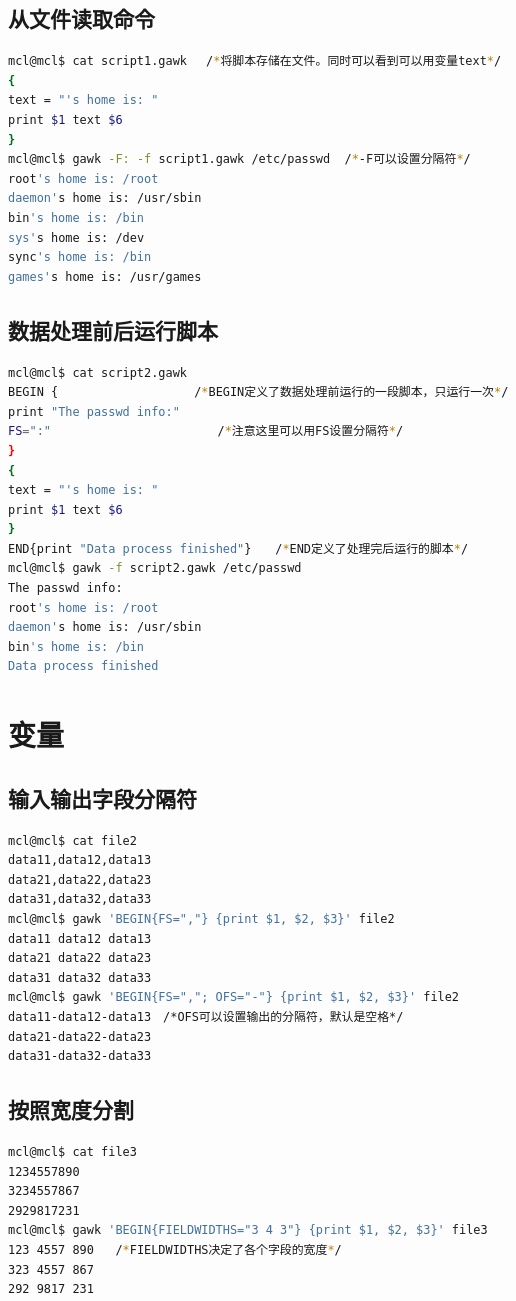 \documentclass{article}
\begin{document}
\subsection{从文件读取命令}
\begin{lstlisting}[language=bash, caption={1.3}]
mcl@mcl$ cat script1.gawk 　/*将脚本存储在文件。同时可以看到可以用变量text*/
{
text = "'s home is: "
print $1 text $6
}
mcl@mcl$ gawk -F: -f script1.gawk /etc/passwd  /*-F可以设置分隔符*/
root's home is: /root
daemon's home is: /usr/sbin
bin's home is: /bin
sys's home is: /dev
sync's home is: /bin
games's home is: /usr/games
\end{lstlisting}

\subsection{数据处理前后运行脚本}
\begin{lstlisting}[language=bash, caption={1.4}]
mcl@mcl$ cat script2.gawk 
BEGIN {                   /*BEGIN定义了数据处理前运行的一段脚本，只运行一次*/
print "The passwd info:"
FS=":"　　　　　　　　　　　　　　/*注意这里可以用FS设置分隔符*/
}
{
text = "'s home is: "
print $1 text $6
}
END{print "Data process finished"}　　/*END定义了处理完后运行的脚本*/
mcl@mcl$ gawk -f script2.gawk /etc/passwd
The passwd info:
root's home is: /root
daemon's home is: /usr/sbin
bin's home is: /bin
Data process finished
\end{lstlisting}

\section{变量}
\subsection{输入输出字段分隔符}
\begin{lstlisting}[language=bash, caption={2.1}]
mcl@mcl$ cat file2
data11,data12,data13
data21,data22,data23
data31,data32,data33
mcl@mcl$ gawk 'BEGIN{FS=","} {print $1, $2, $3}' file2
data11 data12 data13
data21 data22 data23
data31 data32 data33
mcl@mcl$ gawk 'BEGIN{FS=","; OFS="-"} {print $1, $2, $3}' file2 
data11-data12-data13　/*OFS可以设置输出的分隔符，默认是空格*/
data21-data22-data23
data31-data32-data33
\end{lstlisting}
\subsection{按照宽度分割}
\begin{lstlisting}[language=bash, caption={2.2}]
mcl@mcl$ cat file3
1234557890
3234557867
2929817231
mcl@mcl$ gawk 'BEGIN{FIELDWIDTHS="3 4 3"} {print $1, $2, $3}' file3
123 4557 890   /*FIELDWIDTHS决定了各个字段的宽度*/
323 4557 867
292 9817 231
\end{lstlisting}
\end{document}
